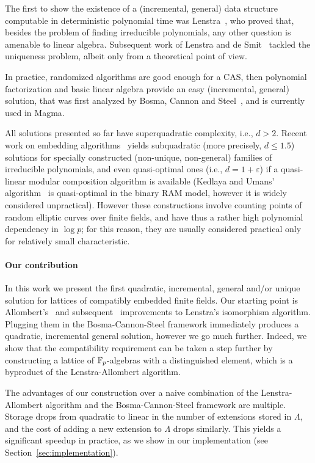 \documentclass{sig-alternate}
\begin{document}
The first to show the existence of a (incremental, general) data
structure computable in deterministic polynomial time was
Lenstra~\cite{LenstraJr91}, who proved that, besides the problem of
finding irreducible polynomials, any other question is amenable to
linear algebra. %
Subsequent work of Lenstra and de
Smit~\cite{lenstra+desmit08-stdmodels} tackled the uniqueness problem,
albeit only from a theoretical point of view. %

In practice, randomized algorithms are good enough for a CAS, then
polynomial factorization and basic linear algebra provide an easy
(incremental, general) solution, that was first analyzed by Bosma,
Cannon and Steel~\cite{bosma+cannon+steel97}, and is currently used in
Magma. %

All solutions presented so far have superquadratic complexity, i.e.,
$d>2$. %
Recent work on embedding algorithms~\cite{DoSc12,DeDoSc13,DeDoSc2014}
yields subquadratic (more precisely, $d\le 1.5$) solutions for
specially constructed (non-unique, non-general) families of
irreducible polynomials, and even quasi-optimal ones (i.e.,
$d=1+\varepsilon$) if a quasi-linear modular composition algorithm is
available (Kedlaya and Umans' algorithm~\cite{KeUm11} is quasi-optimal
in the binary RAM model, however it is widely considered
unpractical). %
However these constructions involve counting points of random elliptic
curves over finite fields, and have thus a rather high polynomial
dependency in $\log p$; for this reason, they are usually considered
practical only for relatively small characteristic.


\paragraph{Our contribution}
In this work we present the first
quadratic, %
incremental, general and/or unique %
solution for lattices of compatibly embedded finite fields. %
Our starting point is Allombert's~\cite{Allombert02} and
subsequent~\cite{brieulle2018computing} improvements to Lenstra's
isomorphism algorithm. %
Plugging them in the Bosma-Cannon-Steel framework immediately produces
a quadratic, incremental general solution, however we go much
further. %
Indeed, we show that the compatibility requirement can be taken a step
further by constructing a lattice of $\mathbb{F}_p$-algebras with a
distinguished element, which is a byproduct of the Lenstra-Allombert
algorithm.

The advantages of our construction over a naive combination of the
Lenstra-Allombert algorithm and the Bosma-Cannon-Steel framework are
multiple. %
Storage drops from quadratic to linear in the number of extensions
stored in $\Lambda$, and the cost of adding a new extension to
$\Lambda$ drops similarly. %
This yields a significant speedup in practice, as we show in our
implementation (see Section~\ref{sec:implementation}).
\end{document}
